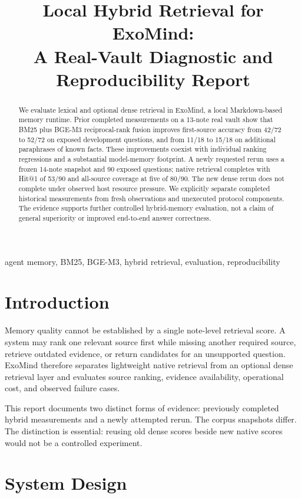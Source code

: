 \documentclass[conference]{IEEEtran}
\title{Local Hybrid Retrieval for ExoMind:\\A Real-Vault Diagnostic and Reproducibility Report}
\author{\IEEEauthorblockN{ExoMind Project}\IEEEauthorblockA{Internal research report\\Not a peer-reviewed IEEE publication}}
\begin{document}
\maketitle
\begin{abstract}
We evaluate lexical and optional dense retrieval in ExoMind, a local Markdown-based memory runtime. Prior completed measurements on a 13-note real vault show that BM25 plus BGE-M3 reciprocal-rank fusion improves first-source accuracy from 42/72 to 52/72 on exposed development questions, and from 11/18 to 15/18 on additional paraphrases of known facts. These improvements coexist with individual ranking regressions and a substantial model-memory footprint. A newly requested rerun uses a frozen 14-note snapshot and 90 exposed questions; native retrieval completes with Hit@1 of 53/90 and all-source coverage at five of 80/90. The new dense rerun does not complete under observed host resource pressure. We explicitly separate completed historical measurements from fresh observations and unexecuted protocol components. The evidence supports further controlled hybrid-memory evaluation, not a claim of general superiority or improved end-to-end answer correctness.
\end{abstract}
\begin{IEEEkeywords}
agent memory, BM25, BGE-M3, hybrid retrieval, evaluation, reproducibility
\end{IEEEkeywords}

\section{Introduction}
Memory quality cannot be established by a single note-level retrieval score. A system may rank one relevant source first while missing another required source, retrieve outdated evidence, or return candidates for an unsupported question. ExoMind therefore separates lightweight native retrieval from an optional dense retrieval layer and evaluates source ranking, evidence availability, operational cost, and observed failure cases.

This report documents two distinct forms of evidence: previously completed hybrid measurements and a newly attempted rerun. The corpus snapshots differ. The distinction is essential: reusing old dense scores beside new native scores would not be a controlled experiment.

\section{System Design}
\end{document}
